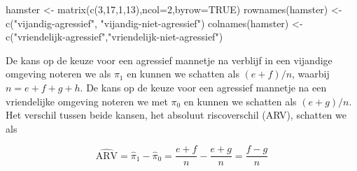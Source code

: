\documentclass[
  dutch,
  letterpaper,
  12pt]{book}
\newenvironment{Shaded}{\begin{snugshade}}{\end{snugshade}}
\newcommand{\AttributeTok}[1]{\textcolor[rgb]{0.40,0.45,0.13}{#1}}
\newcommand{\ConstantTok}[1]{\textcolor[rgb]{0.56,0.35,0.01}{#1}}
\newcommand{\DecValTok}[1]{\textcolor[rgb]{0.68,0.00,0.00}{#1}}
\newcommand{\FunctionTok}[1]{\textcolor[rgb]{0.28,0.35,0.67}{#1}}
\newcommand{\NormalTok}[1]{\textcolor[rgb]{0.00,0.23,0.31}{#1}}
\newcommand{\OtherTok}[1]{\textcolor[rgb]{0.00,0.23,0.31}{#1}}
\newcommand{\StringTok}[1]{\textcolor[rgb]{0.13,0.47,0.30}{#1}}
\theoremstyle{definition}
\theoremstyle{definition}
\theoremstyle{definition}
\theoremstyle{remark}
\begin{document}
\begin{Shaded}
\begin{Highlighting}[]
\NormalTok{hamster }\OtherTok{\textless{}{-}} \FunctionTok{matrix}\NormalTok{(}\FunctionTok{c}\NormalTok{(}\DecValTok{3}\NormalTok{,}\DecValTok{17}\NormalTok{,}\DecValTok{1}\NormalTok{,}\DecValTok{13}\NormalTok{),}\AttributeTok{ncol=}\DecValTok{2}\NormalTok{,}\AttributeTok{byrow=}\ConstantTok{TRUE}\NormalTok{)}
\FunctionTok{rownames}\NormalTok{(hamster) }\OtherTok{\textless{}{-}} \FunctionTok{c}\NormalTok{(}\StringTok{"vijandig{-}agressief"}\NormalTok{, }\StringTok{"vijandig{-}niet{-}agressief"}\NormalTok{)}
\FunctionTok{colnames}\NormalTok{(hamster) }\OtherTok{\textless{}{-}} \FunctionTok{c}\NormalTok{(}\StringTok{"vriendelijk{-}agressief"}\NormalTok{,}\StringTok{"vriendelijk{-}niet{-}agressief"}\NormalTok{)}
\end{Highlighting}
\end{Shaded}

\begin{table}

\caption{\label{tbl-catHamster}}


\end{table}%

De kans op de keuze voor een agressief mannetje na verblijf in een
vijandige omgeving noteren we als \(\pi_1\) en kunnen we schatten als
\((e+f)/n\), waarbij \(n=e+f+g+h\). De kans op de keuze voor een
agressief mannetje na een vriendelijke omgeving noteren we met \(\pi_0\)
en kunnen we schatten als \((e+g)/n\). Het verschil tussen beide kansen,
het absoluut riscoverschil (ARV), schatten we als

\begin{equation*}
\widehat{\text{ARV}}=\hat\pi_1-\hat\pi_0=\frac{e+f}{n}-\frac{e+g}{n}=\frac{f-g}{n}
\end{equation*}
\end{document}
